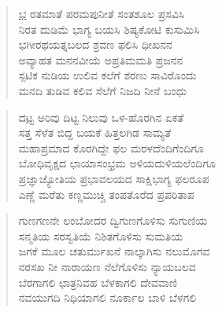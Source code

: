 \begin{verse}
\underline{ಭ} ರತಮಾತೆ ಪರಮಪುನೀತೆ ಸಂತಶೂಲ ಪ್ರಸವಿಸಿ\\
ನಿರತ ದುಡಿಮೆ ಭಾಗ್ಯ ಬಯಸಿ ಶಿಷ್ಯಕೋಟಿ ಕುಸುಮಿಸಿ\\
ಭಗೀರಥಯತ್ನಬಲದ ಶ್ರವಣ ಫಲಿಸಿ ಧೀಖನನ\\
ಅವ್ಯಾಹತ ಮನನವೀಯೆ ಅಪ್ರತಿಮಮತಿ ಪ್ರಜನನ\\
ಸ್ಪಟಿಕ ನುಡಿಯ ಉಲಿವ ಕಲೆಗೆ ಶರಣು ಸಾವಿರೊಂದು\\
ಮನದಿ ತುಡಿವ ಕಲಿವ ಸೆಲೆಗೆ ನಿಜದಿ ನೀನೆ ಬಂಧು
\end{verse}
\begin{verse}
ದ\underline{ಟ್ಟ} ಅರಿವು ದಿಟ್ಟ ನಿಲುವು ಒಳ-ಹೊರಗಿನ ಏಕತೆ\\
ಸತ್ತ ಸೆಳೆತ ಬಿದ್ದ ಬಯಕೆ ಹಿತ್ತಲಗಿಡ ಸಾಮ್ಯತೆ\\
ಮಹಾಪ್ರಮಾದ ಕೊರಗಿದ್ದೇ ಫಲ ಮರಳದೆಂದಿಗೆಂದಿಗೂ\\
ಬೋಧಿವೃಕ್ಷದ ಛಾಯಾಸಂಭ್ರಮ ಅಳಿಯದುಳಿಯಲೆಂದಿಗೂ\\
ಪ್ರಜ್ಞಾಜ್ಯೋತಿಯ ಪ್ರಭಾವಲಯದ ಸಾಕ್ಷಿಭಾಗ್ಯ ಫಲರೂಪ\\
ಎಣ್ಣೆ ಮರೆತು ಕಣ್ಣಮುಚ್ಚಿ ತಂಪತೊರೆದ ಪ್ರಪರಿತಾಪ
\end{verse}
\begin{verse}
ಗುಣಗಣನೇ ಲಂಬೋದರ ದ್ವಿಗುಣಗೊಳಿಸು ಸುಗುಣಿಯ\\
ಸನ್ಮತಿಯ ಸರಸ್ವತಿಯೆ ನಿಶಿತಗೊಳಿಸು ಸುಮತಿಯ\\
ಜಗಕೆ ಮೂಲ ಚತುರ್ಮುಖನೆ ನಾಲ್ಕಾಗಿಸು ನಲುಮೊಗವ\\
ನರಸಖ ನೀ ನಾರಾಯಣ ನೆಲೆಗೊಳಿಸು ನ್ಯಾಯಬಲವ\\
ಬೆರಗಾಗಲಿ ಛಾತ್ರನಿವಹ ಬೆಳಕಾಗಲಿ ದೇವವಾಣಿ\\
ನವಯುಗದಿ ನಿಧಿಯಾಗಲಿ ನೂರ್ಕಾಲ ಬಾಳಿ ಬೆಳಗಲಿ
\end{verse}
